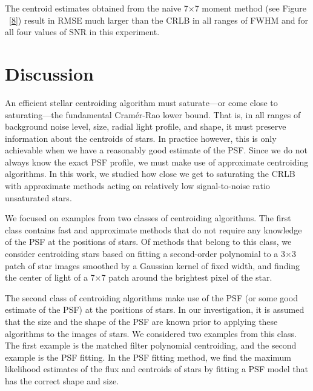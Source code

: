 \documentclass[onecolumn]{aastex61}
\newcommand{\todo}[1]{{\textcolor{dred}{ #1}}}
\begin{document}
The centroid estimates obtained from the naive 7$\times$7 moment method (see Figure ~\ref{8}) result in RMSE much larger than the CRLB in all ranges of FWHM and for all four values of SNR in this experiment. 

\section{Discussion}\label{sec:discussion}

An efficient stellar centroiding algorithm must saturate---or come close to saturating---the fundamental 
Cram\'{e}r-Rao lower bound. That is, in all ranges of background noise level, size, radial light profile,
and shape, it must preserve information about the centroids of stars. In practice however,
this is only achievable when we have a reasonably good estimate of the PSF. Since we do not always 
know the exact PSF profile, we must make use of approximate centroiding algorithms. \todo{In this work, we
studied how close we get to saturating the CRLB with approximate methods acting on relatively low 
signal-to-noise ratio unsaturated stars.}
 
We focused on examples from two classes of centroiding algorithms. The first class contains fast and approximate
methods that do not require any knowledge of the PSF at the positions of stars. Of methods that belong to this class,
we consider centroiding stars based on fitting a second-order
polynomial to a 3$\times$3 patch of star images smoothed by a Gaussian kernel of fixed width, and finding the center of light 
of a 7$\times$7 patch around the brightest pixel of the star.

\todo{The second class of centroiding algorithms make use of the PSF (or some good estimate of the PSF)
at the positions of stars. In our investigation, it is assumed that the size and the shape of the PSF are known prior to applying these algorithms to the images of stars.} We considered two examples from this class. The first example is the matched filter polynomial centroiding, and the
second example is the PSF fitting. \todo{In the PSF fitting method, we find the maximum likelihood estimates of the flux and centroids of stars by fitting a PSF model that has the correct shape and size.}  

\end{document}
